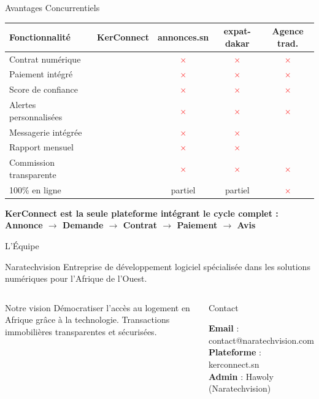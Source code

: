 ﻿\documentclass[aspectratio=169,10pt]{beamer}
\newcommand{\kcbold}[1]{\textcolor{kcCoral}{\textbf{#1}}}
\newcommand{\kcblue}[1]{\textcolor{kcIndigo}{\textbf{#1}}}
\newcommand{\oui}{\textcolor{kcGreen}{\textbf{\checkmark}}}
\newcommand{\non}{\textcolor{red}{\textbf{$\times$}}}
\begin{document}
\begin{frame}{Avantages Concurrentiels}
\begin{center}
\begin{tabular}{lcccc}
\toprule
\textbf{Fonctionnalit\'{e}} & \textbf{KerConnect} & \textbf{annonces.sn} & \textbf{expat-dakar} & \textbf{Agence trad.} \\
\midrule
Contrat num\'{e}rique        & \oui & \non & \non & \non \\
Paiement int\'{e}gr\'{e}     & \oui & \non & \non & \non \\
Score de confiance           & \oui & \non & \non & \non \\
Alertes personnalis\'{e}es   & \oui & \non & \non & \non \\
Messagerie int\'{e}gr\'{e}e  & \oui & \non & \non & \oui \\
Rapport mensuel              & \oui & \non & \non & \oui \\
Commission transparente      & \oui & \non & \non & \non \\
100\% en ligne               & \oui & partiel & partiel & \non \\
\bottomrule
\end{tabular}
\end{center}
\vspace{0.3cm}
\begin{center}
\kcbold{KerConnect est la seule plateforme int\'{e}grant le cycle complet :}\\
\kcblue{Annonce $\rightarrow$ Demande $\rightarrow$ Contrat $\rightarrow$ Paiement $\rightarrow$ Avis}
\end{center}
\end{frame}

\begin{frame}{L'\'{E}quipe}
\begin{center}
\begin{block}{\centering Naratechvision}
\centering
Entreprise de d\'{e}veloppement logiciel sp\'{e}cialis\'{e}e dans les solutions num\'{e}riques pour l'Afrique de l'Ouest.
\end{block}
\end{center}
\vspace{0.3cm}
\begin{columns}[T]
\begin{block}{Notre vision}
D\'{e}mocratiser l'acc\`{e}s au logement en Afrique gr\^{a}ce \`{a} la technologie. Transactions immobili\`{e}res transparentes et s\'{e}curis\'{e}es.
\end{block}
\begin{block}{Contact}
\begin{center}
\textbf{Email} : contact@naratechvision.com\\[0.4cm]
\textbf{Plateforme} : kerconnect.sn\\[0.4cm]
\textbf{Admin} : Hawoly (Naratechvision)
\end{center}
\end{block}
\end{columns}
\end{frame}
\end{document}

